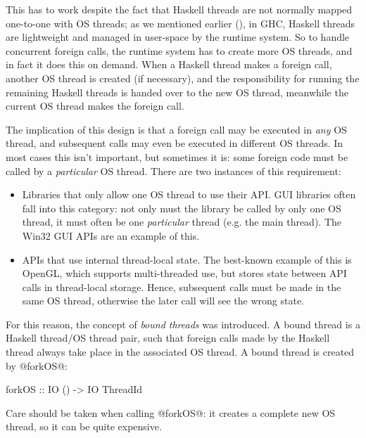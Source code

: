 This has to work despite the fact that Haskell threads are not
normally mapped one-to-one with OS threads; as we mentioned earlier
(), in GHC, Haskell threads are lightweight and
managed in user-space by the runtime system.  So to handle concurrent
foreign calls, the runtime system has to create more OS threads, and
in fact it does this on demand.  When a Haskell thread makes a foreign
call, another OS thread is created (if necessary), and the
responsibility for running the remaining Haskell threads is handed
over to the new OS thread, meanwhile the current OS thread makes the
foreign call.

The implication of this design is that a foreign call may be executed
in \emph{any} OS thread, and subsequent calls may even be executed in
different OS threads. In most cases this isn't important, but
sometimes it is: some foreign code must be called by a \emph{particular}
OS thread.  There are two instances of this requirement:

\begin{itemize}
\item Libraries that only allow one OS thread to use their API.  GUI
  libraries often fall into this category: not only must the library
  be called by only one OS thread, it must often be one
  \emph{particular} thread (e.g. the main thread).  The Win32 GUI APIs
  are an example of this.

\item APIs that use internal thread-local state.  The best-known
  example of this is OpenGL, which supports multi-threaded use, but
  stores state between API calls in thread-local storage.  Hence,
  subsequent calls must be made in the same OS thread, otherwise the
  later call will see the wrong state.
\end{itemize}

For this reason, the concept of \emph{bound threads} was introduced.
A bound thread is a Haskell thread/OS thread pair, such that foreign
calls made by the Haskell thread always take place in the associated
OS thread.  A bound thread is created by @forkOS@:

\begin{haskell}
forkOS :: IO () -> IO ThreadId
\end{haskell}

\noindent Care should be taken when calling @forkOS@: it creates a
complete new OS thread, so it can be quite expensive.


